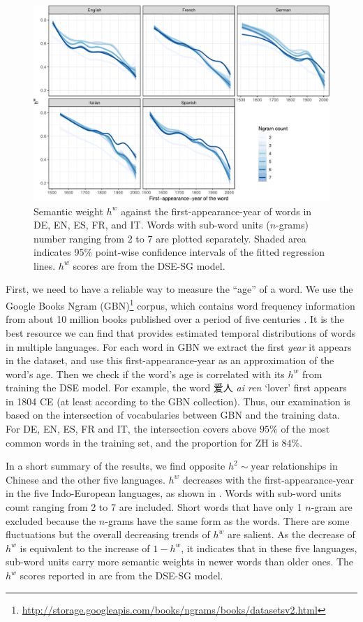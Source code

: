 \documentclass[output=paper]{langsci/langscibook}
\begin{document}
\begin{figure}[t]
\centering
\includegraphics[width=\linewidth]{figures/XU_hw_year_ngramCount2to7_DSE_sg_wikiAllLangs}
\caption{Semantic weight $h^w$ against the first-appearance-year of words in DE, EN, ES, FR, and IT. Words with sub-word units ($n$-grams) number ranging from 2 to 7 are plotted separately. Shaded area indicates 95\% point-wise confidence intervals of the fitted regression lines. $h^w$ scores are from the DSE-SG model.}\label{fig:hw_year_fivelangs}
\end{figure}

First, we need to have a reliable way to measure the ``age'' of a word. 
We use the Google Books Ngram (GBN)\footnote{ \url{http://storage.googleapis.com/books/ngrams/books/datasetsv2.html}} corpus, which contains word frequency information from about 10 million books published over a period of five centuries \citep{lin-etal-2012-syntactic}. 
It is the best resource we can find that provides estimated temporal distributions of words in multiple languages. 
For each word in GBN we extract the first \emph{year} it appears in the dataset, and use this first-appearance-year as an approximation of the word's age. Then we check if the word's age is correlated with its $h^w$ from training the DSE model. 
For example, the word {\cjkfont 爱人} \textit{ai ren} `lover' first appears in 1804 CE (at least according to the GBN collection).
Thus, our examination is based on the intersection of vocabularies between GBN and the training data. For DE, EN, ES, FR and IT, the intersection covers above $95\%$ of the most common words in the training set, and the proportion for ZH is $84\%$.\largerpage


In a short summary of the results, we find opposite $h^2 \sim \text{year}$ relationships in Chinese and the other five languages. 
$h^w$ decreases with the first-appearance-year in the five Indo-European languages, as shown in . Words with sub-word units count ranging from 2 to 7 are included. Short words that have only 1 $n$-gram are excluded because the $n$-grams have the same form as the words. There are some fluctuations but the overall decreasing trends of $h^w$ are salient. 
As the decrease of $h^w$ is equivalent to the increase of $1-h^w$, it indicates that in these five languages, sub-word units carry more semantic weights in newer words than older ones. The $h^w$ scores reported in  are from the DSE-SG model.
\end{document}
